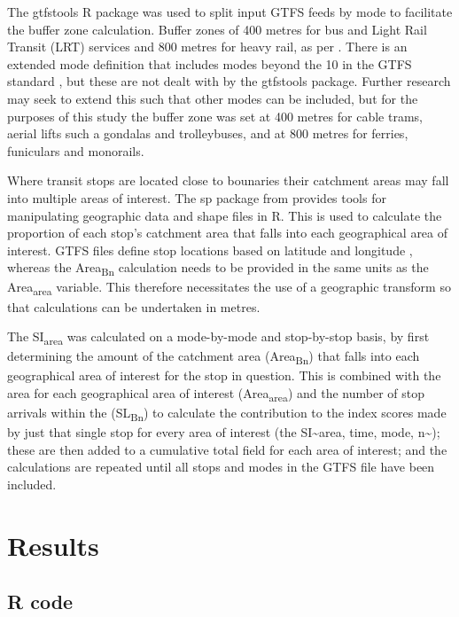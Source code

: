 \documentclass[numbered]{trbunofficial}
\begin{document}
The gtfstools R package \citep{R-gtfstools} was used to split input GTFS
feeds by mode to facilitate the buffer zone calculation. Buffer zones of
400 metres for bus and Light Rail Transit (LRT) services and 800 metres
for heavy rail, as per \citet{currie2007identifying}. There is an
extended mode definition that includes modes beyond the 10 in the GTFS
standard \citep{filter_GTFS_by_mode}, but these are not dealt with by
the gtfstools package. Further research may seek to extend this such
that other modes can be included, but for the purposes of this study the
buffer zone was set at 400 metres for cable trams, aerial lifts such a
gondalas and trolleybuses, and at 800 metres for ferries, funiculars and
monorails.

Where transit stops are located close to bounaries their catchment areas
may fall into multiple areas of interest. The sp package from
\citep[\citet{applied_spatial_data_analysis_with_R}]{spatial_data_in_R}
provides tools for manipulating geographic data and shape files in R.
This is used to calculate the proportion of each stop's catchment area
that falls into each geographical area of interest. GTFS files define
stop locations based on latitude and longitude
\citep{GTFS_schedule_reference}, whereas the Area\textsubscript{Bn}
calculation needs to be provided in the same units as the
Area\textsubscript{area} variable. This therefore necessitates the use
of a geographic transform so that calculations can be undertaken in
metres.

The SI\textsubscript{area} was calculated on a mode-by-mode and
stop-by-stop basis, by first determining the amount of the catchment
area (Area\textsubscript{Bn}) that falls into each geographical area of
interest for the stop in question. This is combined with the area for
each geographical area of interest (Area\textsubscript{area}) and the
number of stop arrivals within the (SL\textsubscript{Bn}) to calculate
the contribution to the index scores made by just that single stop for
every area of interest (the SI\textasciitilde area, time, mode,
n\textasciitilde); these are then added to a cumulative total field for
each area of interest; and the calculations are repeated until all stops
and modes in the GTFS file have been included.

\hypertarget{results}{%
\section{Results}\label{results}}

\hypertarget{r-code}{%
\subsection{R code}\label{r-code}}
\end{document}
